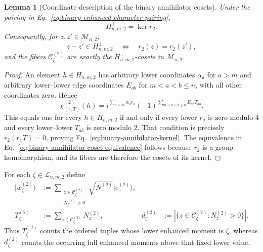 \documentclass[11pt]{article}
\newcommand{\1}{\mathbf 1}
\newcommand{\ket}[1]{\lvert #1\rangle}
\theoremstyle{plain}
\newtheorem{lemma}[theorem]{Lemma}
\theoremstyle{definition}
\theoremstyle{remark}
\begin{document}
\begin{lemma}[Coordinate description of the binary annihilator cosets]
\label{lem:binary-annihilator-cosets}
Under the pairing in Eq.~\eqref{eq:binary-enhanced-character-pairing},
\begin{equation}
 H_{n,m,2}^\perp=\ker r_2.
 \label{eq:binary-annihilator-kernel}
\end{equation}
Consequently, for $z,z'\in\mathcal M_{n,2}$,
\begin{equation}
 z-z'\in H_{n,m,2}^\perp
 \quad\Longleftrightarrow\quad
 r_2(z)=r_2(z'),
 \label{eq:binary-annihilator-coset-equivalence}
\end{equation}
and the fibers $\mathcal C_\zeta^{(2)}$ are exactly the
$H_{n,m,2}^\perp$-cosets in $\mathcal M_{n,2}$.
\end{lemma}
\begin{proof}
An element $h\in H_{n,m,2}$ has arbitrary lower coordinates
$\alpha_a$ for $a>m$ and arbitrary lower--lower edge coordinates $E_{ab}$
for $m<a<b\le n$, with all other coordinates zero.  Hence
\begin{equation}
 \chi_{(r,T)}^{(2)}(h)
 =i^{\sum_{a>m}\alpha_a r_a}
  (-1)^{\sum_{m<a<b\le n}E_{ab}T_{ab}}.
 \label{eq:binary-unreported-subgroup-pairing}
\end{equation}
This equals one for every $h\in H_{n,m,2}$ if and only if every lower
$r_a$ is zero modulo $4$ and every lower--lower $T_{ab}$ is zero modulo $2$.
That condition is precisely $r_2(r,T)=0$, proving
Eq.~\eqref{eq:binary-annihilator-kernel}.  The equivalence in
Eq.~\eqref{eq:binary-annihilator-coset-equivalence} follows because $r_2$ is a
group homomorphism, and its fibers are therefore the cosets of its kernel.
\end{proof}

For each $\zeta\in\mathcal L_{n,m,2}$ define
\begin{align}
 \ket{w_\zeta^{(2)}}
 &:=\sum_{\substack{z\in\mathcal C_\zeta^{(2)}\\N_z^{(2)}>0}}
       \sqrt{N_z^{(2)}}\ket{e_z^{(2)}},
 \label{eq:integrated-qubit-lower-block-vector}\\
 T_\zeta^{(2)}
 &:=\sum_{z\in\mathcal C_\zeta^{(2)}}N_z^{(2)},
 &
 d_\zeta^{(2)}
 &:=|\{z\in\mathcal C_\zeta^{(2)}:N_z^{(2)}>0\}|.
 \label{eq:binary-coset-mass-and-support}
\end{align}
Thus $T_\zeta^{(2)}$ counts the ordered tuples whose lower enhanced moment is
$\zeta$, whereas $d_\zeta^{(2)}$ counts the occurring full enhanced moments
above that fixed lower value.
\end{document}
